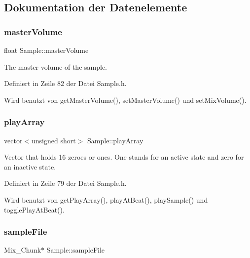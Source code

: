 \subsection{Dokumentation der Datenelemente}
\mbox{\label{class_sample_a2d48ff8caf8425c37cf74130afb0c87a}} 
\subsubsection{\texorpdfstring{master\+Volume}{masterVolume}}
{\footnotesize\ttfamily float Sample\+::master\+Volume\hspace{0.3cm}{\ttfamily [private]}}



The master volume of the sample. 



Definiert in Zeile 82 der Datei Sample.\+h.



Wird benutzt von get\+Master\+Volume(), set\+Master\+Volume() und set\+Mix\+Volume().

\mbox{\label{class_sample_a824014df7294cb94445e7ee89cc15987}} 
\subsubsection{\texorpdfstring{play\+Array}{playArray}}
{\footnotesize\ttfamily vector$<$unsigned short$>$ Sample\+::play\+Array\hspace{0.3cm}{\ttfamily [private]}}



Vector that holds 16 zeroes or ones. One stands for an active state and zero for an inactive state. 



Definiert in Zeile 79 der Datei Sample.\+h.



Wird benutzt von get\+Play\+Array(), play\+At\+Beat(), play\+Sample() und toggle\+Play\+At\+Beat().

\mbox{\label{class_sample_ae158342c8d18a05de1c85802f7cfbd2a}} 
\subsubsection{\texorpdfstring{sample\+File}{sampleFile}}
{\footnotesize\ttfamily Mix\+\_\+\+Chunk$\ast$ Sample\+::sample\+File\hspace{0.3cm}{\ttfamily [private]}}



